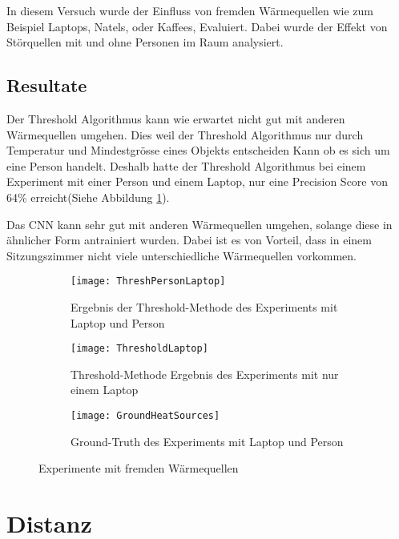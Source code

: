 In diesem Versuch wurde der Einfluss von fremden Wärmequellen wie zum Beispiel Laptops, Natels, oder Kaffees, Evaluiert. Dabei wurde der Effekt von Störquellen mit und ohne Personen im Raum analysiert.

\subsection{Resultate}
\label{subsec:FWresultate}

Der Threshold Algorithmus kann wie erwartet nicht gut mit anderen Wärmequellen umgehen. Dies weil der Threshold Algorithmus nur durch Temperatur und Mindestgrösse eines Objekts entscheiden Kann ob es sich um eine Person handelt. Deshalb hatte der Threshold Algorithmus bei einem Experiment mit einer Person und einem Laptop, nur eine Precision Score von 64\% erreicht(Siehe Abbildung \ref{fig:threshPersonLaptop}).

Das CNN kann sehr gut mit anderen Wärmequellen umgehen, solange diese in ähnlicher Form antrainiert wurden. Dabei ist es von Vorteil, dass in einem Sitzungszimmer nicht viele unterschiedliche Wärmequellen vorkommen.

\vspace{.5em}
\begin{figure}[H]
	\begin{subfigure}{.45\linewidth}
		\texttt{[image: ThreshPersonLaptop]}
		\caption{Ergebnis der Threshold-Methode des Experiments mit Laptop und Person}
		\label{fig:threshPersonLaptop}
	\end{subfigure}\hfill%
	\begin{subfigure}{.45\linewidth}
		\centering
		\texttt{[image: ThresholdLaptop]}
		\caption{Threshold-Methode Ergebnis des Experiments mit nur einem Laptop}
		\label{fig:thresholdDistanice10}
	\end{subfigure}
	\begin{subfigure}{\linewidth}
		\centering
		\texttt{[image: GroundHeatSources]}
		\caption{Ground-Truth des Experiments mit Laptop und Person}
		\label{fig:groundDiistance10}
	\end{subfigure}
	\caption{Experimente mit fremden Wärmequellen}
	\label{fig:HeatSources}
\end{figure}
\vspace{.5em}



\section{Distanz}
\label{sec:distanz}


